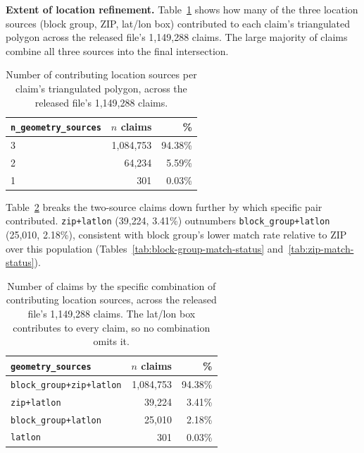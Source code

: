 

\textbf{Extent of location refinement.} Table~\ref{tab:n-geometry-sources}
shows how many of the three location sources (block group, ZIP,
lat/lon box) contributed to each claim's triangulated polygon across
the released file's 1,149,288 claims. The large majority of claims
combine all three sources into the final intersection.

\begin{table}[H]
\centering
\begin{tabular}{lrr}
\toprule
\texttt{n\_geometry\_sources} & $n$ claims & \% \\
\midrule
3 & 1{,}084{,}753 & 94.38\% \\
2 & 64{,}234 & 5.59\% \\
1 & 301 & 0.03\% \\
\bottomrule
\end{tabular}
\caption{Number of contributing location sources per claim's
triangulated polygon, across the released file's 1,149,288 claims.}
\label{tab:n-geometry-sources}
\end{table}

Table~\ref{tab:geometry-sources-breakdown} breaks the two-source claims
down further by which specific pair contributed. \texttt{zip+latlon}
(39{,}224, 3.41\%) outnumbers \texttt{block\_group+latlon} (25{,}010,
2.18\%), consistent with block group's lower match rate relative to
ZIP over this population (Tables~\ref{tab:block-group-match-status}
and~\ref{tab:zip-match-status}).

\begin{table}[H]
\centering
\begin{tabular}{lrr}
\toprule
\texttt{geometry\_sources} & $n$ claims & \% \\
\midrule
\texttt{block\_group+zip+latlon} & 1{,}084{,}753 & 94.38\% \\
\texttt{zip+latlon} & 39{,}224 & 3.41\% \\
\texttt{block\_group+latlon} & 25{,}010 & 2.18\% \\
\texttt{latlon} & 301 & 0.03\% \\
\bottomrule
\end{tabular}
\caption{Number of claims by the specific combination of contributing
location sources, across the released file's 1,149,288 claims. The
lat/lon box contributes to every claim, so no combination omits it.}
\label{tab:geometry-sources-breakdown}
\end{table}

